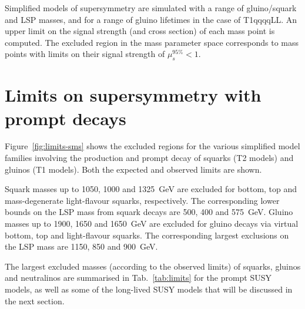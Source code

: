 Simplified models of supersymmetry are simulated with a range of gluino/squark 
and LSP masses, and for a range of gluino lifetimes in the case of T1qqqqLL. An 
upper limit on the signal strength (and cross section) of each mass point is 
computed. The excluded region in the mass parameter space corresponds to mass 
points with limits on their signal strength of $\mu_s^{95\%} < 1$. 

\section{Limits on supersymmetry with prompt decays}

Figure~\ref{fig:limits-sms} shows the excluded regions for the various 
simplified model families involving the production and prompt decay of squarks 
(T2 models) and gluinos (T1 models). Both the expected and observed limits are 
shown. 

Squark masses up to 1050, 1000 and 1325~GeV are excluded for bottom, top and 
mass-degenerate light-flavour squarks, respectively. The corresponding lower 
bounds on the LSP mass from squark decays are 500, 400 and 575~GeV. Gluino 
masses up to 1900, 1650 and 1650~GeV are excluded for gluino decays via virtual 
bottom, top and light-flavour squarks. The corresponding largest exclusions on 
the LSP mass are 1150, 850 and 900~GeV.

The largest excluded masses (according to the observed limits) of squarks, 
gluinos and neutralinos are summarised in Tab.~\ref{tab:limits} for the prompt 
SUSY models, as well as some of the long-lived SUSY models that will be 
discussed in the next section.

